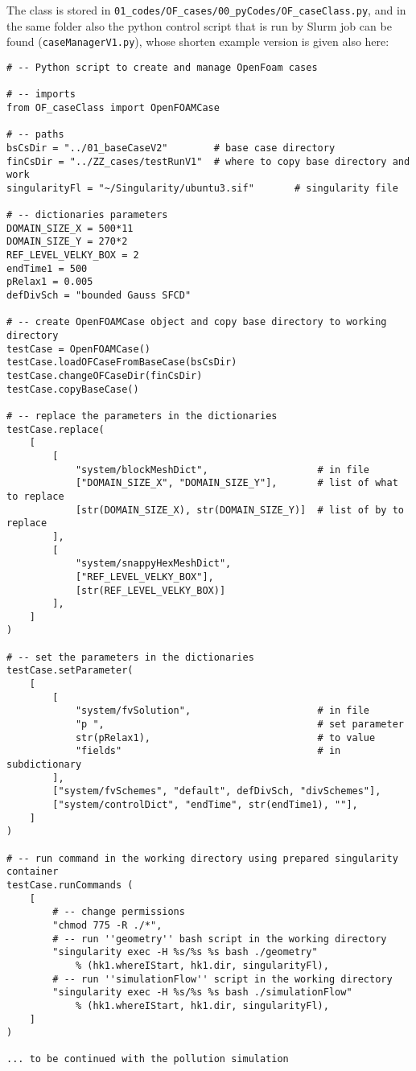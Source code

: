 The class is stored in \texttt{01\_codes/OF\_cases/00\_pyCodes/OF\_caseClass.py}, and in the same folder also the python control script that is run by Slurm job can be found (\texttt{caseManagerV1.py}), whose shorten example version is given also here:
\begin{verbatim}
# -- Python script to create and manage OpenFoam cases

# -- imports 
from OF_caseClass import OpenFOAMCase

# -- paths 
bsCsDir = "../01_baseCaseV2"        # base case directory
finCsDir = "../ZZ_cases/testRunV1"  # where to copy base directory and work
singularityFl = "~/Singularity/ubuntu3.sif"       # singularity file

# -- dictionaries parameters
DOMAIN_SIZE_X = 500*11
DOMAIN_SIZE_Y = 270*2
REF_LEVEL_VELKY_BOX = 2
endTime1 = 500
pRelax1 = 0.005
defDivSch = "bounded Gauss SFCD"

# -- create OpenFOAMCase object and copy base directory to working directory
testCase = OpenFOAMCase()
testCase.loadOFCaseFromBaseCase(bsCsDir)
testCase.changeOFCaseDir(finCsDir)
testCase.copyBaseCase()

# -- replace the parameters in the dictionaries
testCase.replace(
    [
        [
            "system/blockMeshDict",                   # in file
            ["DOMAIN_SIZE_X", "DOMAIN_SIZE_Y"],       # list of what to replace
            [str(DOMAIN_SIZE_X), str(DOMAIN_SIZE_Y)]  # list of by to replace
        ],
        [
            "system/snappyHexMeshDict", 
            ["REF_LEVEL_VELKY_BOX"], 
            [str(REF_LEVEL_VELKY_BOX)]
        ],
    ]
)

# -- set the parameters in the dictionaries 
testCase.setParameter(
    [
        [
            "system/fvSolution",                      # in file 
            "p ",                                     # set parameter
            str(pRelax1),                             # to value
            "fields"                                  # in subdictionary
        ],        
        ["system/fvSchemes", "default", defDivSch, "divSchemes"],
        ["system/controlDict", "endTime", str(endTime1), ""],
    ]
)

# -- run command in the working directory using prepared singularity container
testCase.runCommands (
    [
        # -- change permissions
        "chmod 775 -R ./*",
        # -- run ''geometry'' bash script in the working directory
        "singularity exec -H %s/%s %s bash ./geometry" 
            % (hk1.whereIStart, hk1.dir, singularityFl),
        # -- run ''simulationFlow'' script in the working directory
        "singularity exec -H %s/%s %s bash ./simulationFlow"
            % (hk1.whereIStart, hk1.dir, singularityFl),
    ]
) 

... to be continued with the pollution simulation
\end{verbatim}

